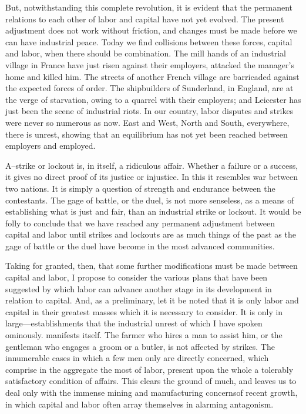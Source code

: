 \documentclass[11pt,openany]{book}
\begin{document}
But, notwithstanding this complete revolution, it is evident that the permanent relations to each other of labor and capital have not yet evolved. The present adjustment does not work without friction, and changes must be made before we can have industrial peace. Today we find collisions between these forces, capital and labor, when there should be combination. The mill hands of an industrial village in France have just risen against their employers, attacked the manager's home and killed him. The streets of another French village are barricaded against the expected forces of order. The shipbuilders of Sunderland, in England, are at the verge of starvation, owing to a quarrel with their employers; and Leicester has just been the scene of industrial riots. In our country, labor disputes and strikes were never so numerous as now. East and West, North and South, everywhere, there is unrest, showing that an equilibrium has not yet been reached between employers and employed.

A--strike or lockout is, in itself, a ridiculous affair. Whether a failure or a success, it gives no direct proof of its justice or injustice. In this it resembles war between two nations. It is simply a question of strength and endurance between the contestants. The gage of battle, or the duel, is not more senseless, as a means of establishing what is just and fair, than an industrial strike or lockout. It would be folly to conclude that we have reached any permanent adjustment between capital and labor until strikes and lockouts are as much things of the past as the gage of battle or the duel have become in the most advanced communities.

Taking for granted, then, that some further modifications must be made between capital and labor, I propose to consider the various plans that have been suggested by which labor can advance another stage in its development in relation to capital. And, as a preliminary, let it be noted that it is only labor and capital in their greatest masses which it is necessary to consider. It is only in large---establishments that the industrial unrest of which I have spoken ominously. manifests itself. The farmer who hires a man to assist him, or the gentleman who engages a groom or a butler, is not affected by strikes. The innumerable cases in which a few men only are directly concerned, which comprise in the aggregate the most of labor, present upon the whole a tolerably satisfactory condition of affairs. This clears the ground of much, and leaves us to deal only with the immense mining and manufacturing concernsof recent growth, in which capital and labor often array themselves in alarming antagonism.
\end{document}
